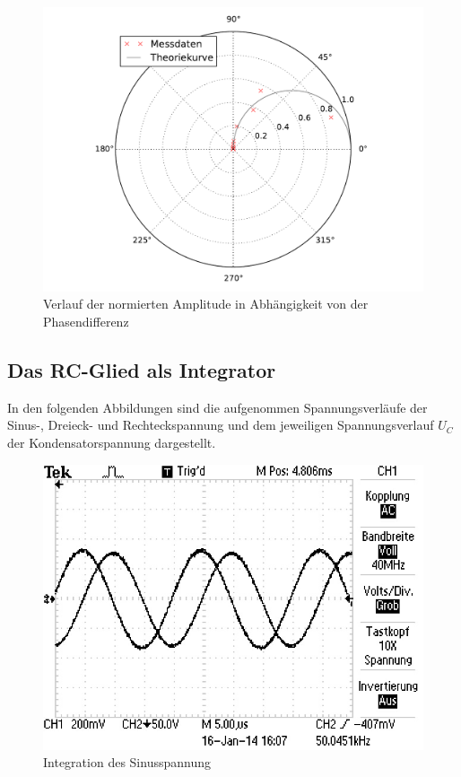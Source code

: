 	\begin{figure}[!h]
		\centering
		\includegraphics[scale=0.6]{Grafiken/Amplitude_Polar.pdf}
		\caption{Verlauf der normierten Amplitude in Abhängigkeit von der Phasendifferenz}
		\label{fig:Auswertung_Amplitude_Phase}
	\end{figure}
	 
\subsection{Das RC-Glied als Integrator}
\label{sec:Auswertung_Integrator}
	In den folgenden Abbildungen sind die aufgenommen Spannungsverläufe der Sinus-, Dreieck- und Rechteckspannung
	und dem jeweiligen Spannungsverlauf $U_{C}$ der Kondensatorspannung dargestellt.
	
	\begin{figure}[!h]
		\centering
		\includegraphics[scale=0.8]{Grafiken/Integrator_Sinus.jpg}
		\caption{Integration des Sinusspannung}
		\label{fig:Auswertung_Integrator_Sinus}
	\end{figure}
	
